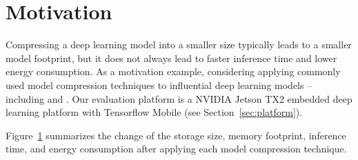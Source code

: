 \section{Motivation}
Compressing a deep learning model into a smaller size typically leads to a smaller model footprint, but it does not always lead to faster
inference time and lower energy consumption. As a motivation example, considering applying  commonly used model compression
techniques to  influential deep learning models -- including  \CNNs and . Our evaluation platform is a
NVIDIA Jetson TX2 embedded deep learning platform with Tensorflow Mobile  (see Section~\ref{sec:platform}).

Figure~\ref{} summarizes the change of the storage size, memory footprint, inference time, and energy consumption after applying each model
compression technique.
